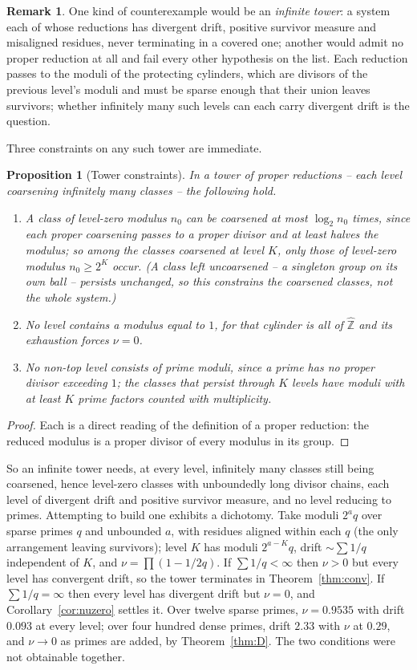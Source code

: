 \documentclass[11pt]{article}
\theoremstyle{plain}
\newtheorem{proposition}[theorem]{Proposition}
\theoremstyle{definition}
\newtheorem{remark}[theorem]{Remark}
\newcommand{\Zhat}{\widehat{\mathbb{Z}}}
\begin{document}
\begin{remark}
One kind of counterexample would be an \emph{infinite tower}: a
system each of whose reductions has divergent drift, positive
survivor measure and misaligned residues, never terminating in a
covered one; another would admit no proper reduction at all and
fail every other hypothesis on the list.  Each reduction passes to the moduli of the protecting
cylinders, which are divisors of the previous level's moduli and
must be sparse enough that their union leaves survivors; whether
infinitely many such levels can each carry divergent drift is
the question.  

Three constraints on any such tower are immediate.

\begin{proposition}[Tower constraints]\label{prop:tower}
In a tower of proper reductions -- each level coarsening
infinitely many classes -- the following hold.
\begin{enumerate}
\item[(i)] A class of level-zero modulus $n_0$ can be coarsened
at most $\log_2 n_0$ times, since each proper coarsening passes
to a proper divisor and at least halves the modulus; so among
the classes coarsened at level $K$, only those of level-zero
modulus $n_0\ge2^K$ occur.  (A class left uncoarsened -- a
singleton group on its own ball -- persists unchanged, so this
constrains the coarsened classes, not the whole system.)
\item[(ii)] No level contains a modulus equal to $1$, for that
cylinder is all of $\Zhat$ and its exhaustion forces
$\nu=0$.
\item[(iii)] No non-top level consists of prime moduli, since a
prime has no proper divisor exceeding $1$; the classes that
persist through $K$ levels have moduli with at least $K$ prime
factors counted with multiplicity.
\end{enumerate}
\end{proposition}

\begin{proof}
Each is a direct reading of the definition of a proper
reduction: the reduced modulus is a proper divisor of every
modulus in its group.
\end{proof}

So an infinite tower needs, at every level, infinitely many
classes still being coarsened, hence level-zero classes with
unboundedly long divisor chains, each level of
divergent drift and positive survivor measure, and no level
reducing to primes.  Attempting to build one exhibits a
dichotomy.  Take moduli $2^{a}q$ over sparse primes $q$ and
unbounded $a$, with residues aligned within each $q$ (the only
arrangement leaving survivors); level $K$ has moduli
$2^{a-K}q$, drift $\sim\sum1/q$ independent of $K$, and
$\nu=\prod(1-1/2q)$.  If $\sum1/q<\infty$ then $\nu>0$ but
every level has convergent drift, so the tower terminates in
Theorem~\ref{thm:conv}.  If $\sum1/q=\infty$ then every level
has divergent drift but $\nu=0$, and Corollary~\ref{cor:nuzero}
settles it.  Over twelve sparse primes, $\nu=0.9535$
with drift $0.093$ at every level; over four hundred dense
primes, drift $2.33$ with $\nu$ at $0.29$, and $\nu\to0$ as
primes are added, by Theorem~\ref{thm:D}.  The two conditions were not obtainable
together.


\end{remark}
\end{document}
